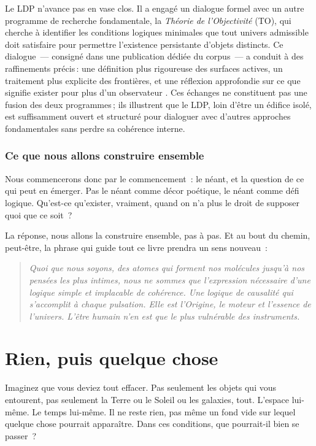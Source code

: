 \documentclass[12pt, a4paper, openright]{book}
\begin{document}
\medskip

Le LDP n'avance pas en vase clos. Il a engagé un dialogue formel avec un autre programme de recherche fondamentale, la \emph{Théorie de l'Objectivité} (TO), qui cherche à identifier les conditions logiques minimales que tout univers admissible doit satisfaire pour permettre l'existence persistante d'objets distincts. Ce dialogue~--- consigné dans une publication dédiée du corpus~--- a conduit à des raffinements précis\,: une définition plus rigoureuse des surfaces actives, un traitement plus explicite des frontières, et une réflexion approfondie sur ce que signifie \og exister pour plus d'un observateur \fg{}. Ces échanges ne constituent pas une fusion des deux programmes\,; ils illustrent que le LDP, loin d'être un édifice isolé, est suffisamment ouvert et structuré pour dialoguer avec d'autres approches fondamentales sans perdre sa cohérence interne.

\subsection*{Ce que nous allons construire ensemble}

Nous commencerons donc par le commencement~: le néant, et la question de ce qui peut en émerger. Pas le néant comme décor poétique, le néant comme défi logique. Qu'est-ce qu'exister, vraiment, quand on n'a plus le droit de supposer quoi que ce soit~?

\medskip

La réponse, nous allons la construire ensemble, pas à pas. Et au bout du chemin, peut-être, la phrase qui guide tout ce livre prendra un sens nouveau~:

\begin{quote}
\itshape Quoi que nous soyons, des atomes qui forment nos molécules jusqu'à nos pensées les plus intimes, nous ne sommes que l'expression nécessaire d'une logique simple et implacable de cohérence. Une logique de causalité qui s'accomplit à chaque pulsation. Elle est l'Origine, le moteur et l'essence de l'univers. L'être humain n'en est que le plus vulnérable des instruments.
\end{quote}

\chapter{Rien, puis quelque chose}

Imaginez que vous deviez tout effacer. Pas seulement les objets qui vous entourent, pas seulement la Terre ou le Soleil ou les galaxies, tout. L'espace lui-même. Le temps lui-même. Il ne reste rien, pas même un fond vide sur lequel quelque chose pourrait apparaître. Dans ces conditions, que pourrait-il bien se passer~?
\end{document}
